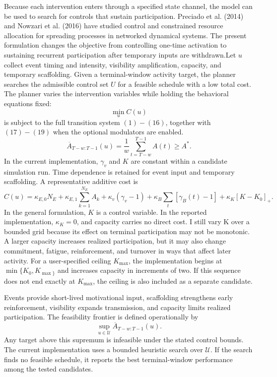 \documentclass[11pt]{article}
\begin{document}
Because each intervention enters through a specified state channel, the model can be used to search for controls that sustain participation. Preciado et al. (2014) and  Nowzari et al. (2016) have studied control and constrained resource allocation for spreading processes in networked dynamical systems. The present formulation changes the objective from controlling one-time activation to sustaining recurrent participation after temporary inputs are withdrawn.Let $u$ collect event timing and intensity, visibility amplification, capacity, and temporary scaffolding. Given a terminal-window activity target, the planner searches the admissible control set $U$ for a feasible schedule with a low total cost. The planner varies the intervention variables while holding the behavioral equations fixed:
\[
\min_u C(u)
\]
is subject to the full transition system $(1)-(16)$, together with $(17)-(19)$ when the optional modulators are enabled.
\[
\overline A_{T-w:T-1}(u)=\frac1w\sum_{t=T-w}^{T-1}A(t)\ge A^*.
\tag{20}
\]
In the current implementation, $\gamma_v$ and $K$ are constant within a candidate simulation run. Time dependence is retained for event input and temporary scaffolding. A representative additive cost is
\[
C(u)=\kappa_{E,0}N_E+\kappa_{E,1}\sum_{k=1}^{N_E} A_k+\kappa_v(\gamma_v-1)+\kappa_B\sum_{t}[\gamma_B(t)-1]+\kappa_K[K-K_0]_+.
\]
In the general formulation, $K$ is a control variable. In the reported implementation, $\kappa_K=0$, and capacity carries no direct cost. I still vary K over a bounded grid because its effect on terminal participation may not be monotonic. A larger capacity increases realized participation, but it may also change commitment, fatigue, reinforcement, and turnover in ways that affect later activity. For a user-specified ceiling $K_{\max}$, the implementation begins at $\min\{K_0,K_{\max\}}$ and increases capacity in increments of two. If this sequence does not end exactly at $K_{\max}$, the ceiling is also included as a separate candidate. 

Events provide short-lived motivational input, scaffolding strengthens early reinforcement, visibility expands transmission, and capacity limits realized participation. The feasibility frontier is defined operationally by
\[
\underset{u\in\mathcal U}{\sup}\overline{A}_{T-w:T-1}(u).
\]
Any target above this supremum is infeasible under the stated control bounds. The current implementation uses a bounded heuristic search over $\mathcal{U}$. If the search finds no feasible schedule, it reports the best terminal-window performance among the tested candidates. 
\end{document}
